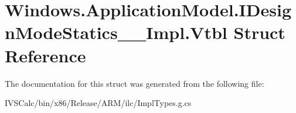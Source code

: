 \hypertarget{struct_windows_1_1_application_model_1_1_i_design_mode_statics_____impl_1_1_vtbl}{}\section{Windows.\+Application\+Model.\+I\+Design\+Mode\+Statics\+\_\+\+\_\+\+Impl.\+Vtbl Struct Reference}
\label{struct_windows_1_1_application_model_1_1_i_design_mode_statics_____impl_1_1_vtbl}


The documentation for this struct was generated from the following file\+:\begin{DoxyCompactItemize}
\item 
I\+V\+S\+Calc/bin/x86/\+Release/\+A\+R\+M/ilc/Impl\+Types.\+g.\+cs\end{DoxyCompactItemize}
